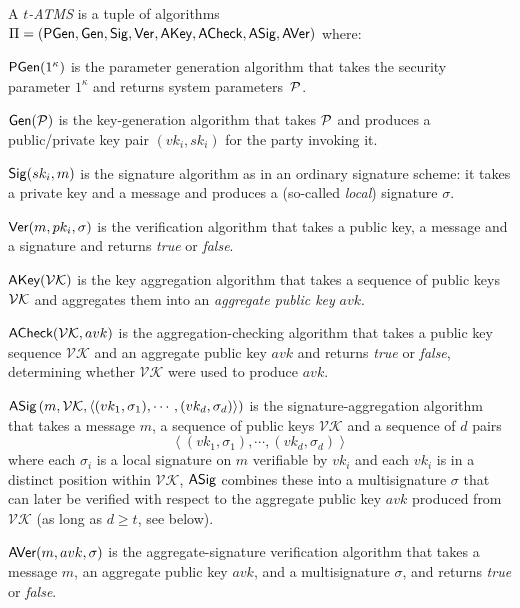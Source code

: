 \begin{definition}
  A \textit{$t$-ATMS} is a tuple of algorithms
  $\Pi = (
    \textsf{PGen},\allowbreak
    \mathsf{Gen},\allowbreak
    \mathsf{Sig},\allowbreak
    \mathsf{Ver},\allowbreak
    \textsf{AKey},\allowbreak
    \textsf{ACheck},\allowbreak
    \textsf{ASig},\allowbreak
    \textsf{AVer}
  )$
  where:
  \begin{description}
  \item $\textsf{PGen}(1^\kappa)$
     is the parameter generation algorithm that takes the security parameter
     $1^\kappa$ and returns system parameters~$\mathcal{P}$.
   \item $\mathsf{Gen}(\mathcal{P})$
     is the key-generation algorithm that takes $\mathcal{P}$ and produces a
     public/private key pair $(vk_i, sk_i)$ for the party invoking it.
   \item $\mathsf{Sig}(sk_i,m)$
    is the signature algorithm as in an ordinary signature scheme: it takes a private
    key and a message and produces a (so-called \emph{local}) signature $\sigma$.
   \item $\mathsf{Ver}(m, pk_i, \sigma)$
    is the verification algorithm that takes a public key, a message and a
    signature and returns \emph{true} or \emph{false}.
   \item $\textsf{AKey}(\mathcal{VK})$
    is the key aggregation algorithm that takes a sequence of public keys $\mathcal{VK}$
    and aggregates them into an \emph{aggregate public key} $avk$.
  \item $\textsf{ACheck}(\mathcal{VK},avk)$
    is the aggregation-checking algorithm that takes a public key sequence
    $\mathcal{VK}$ and an aggregate public key $avk$ and returns \emph{true} or
    \emph{false}, determining whether $\mathcal{VK}$ were used to produce $avk$.
  \item $\textsf{ASig}\left(m,\mathcal{VK},\left<(vk_1,\sigma_1),\cdots, (vk_d, \sigma_d)\right>\right)$
    is the signature-aggregation algorithm that takes a message $m$, a sequence of
    public keys $\mathcal{VK}$ and a sequence of $d$ pairs
    \[
      \left<(vk_1,\sigma_1),\allowbreak \cdots,\allowbreak (vk_d, \sigma_d)\right>
    \]
    where each $\sigma_i$ is a local signature on $m$ verifiable by $vk_i$ and
    each $vk_i$ is in a distinct position within $\mathcal{VK}$, $\textsf{ASig}$
    combines these into a multisignature $\sigma$ that can later be verified with
    respect to the aggregate public key $avk$ produced from $\mathcal{VK}$ (as
    long as $d \geq t$, see below).
  \item $\textsf{AVer}(m,avk,\sigma)$
    is the aggregate-signature verification algorithm that takes
    a message $m$, an aggregate public key $avk$, and a multisignature $\sigma$,
    and returns \emph{true} or \emph{false}.
  \end{description}
\end{definition}

